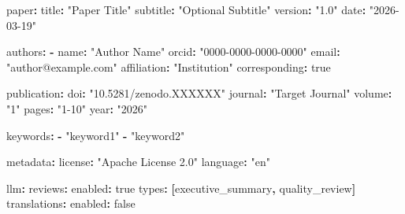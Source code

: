 \documentclass[
  english,
]{article}
\newenvironment{Shaded}{}{}
\newcommand{\AttributeTok}[1]{\textcolor[rgb]{0.49,0.56,0.16}{#1}}
\newcommand{\CharTok}[1]{\textcolor[rgb]{0.25,0.44,0.63}{#1}}
\newcommand{\FunctionTok}[1]{\textcolor[rgb]{0.02,0.16,0.49}{#1}}
\newcommand{\KeywordTok}[1]{\textcolor[rgb]{0.00,0.44,0.13}{\textbf{#1}}}
\newcommand{\StringTok}[1]{\textcolor[rgb]{0.25,0.44,0.63}{#1}}
\begin{document}
\begin{table}[h]
\caption{Configuration schema for \texttt{config.yaml}, showing all supported fields and their structure.}
\label{tab:config-reference}
\end{table}

\begin{Shaded}
\begin{Highlighting}[]
\FunctionTok{paper}\KeywordTok{:}
\AttributeTok{  }\FunctionTok{title}\KeywordTok{:}\AttributeTok{ }\StringTok{"Paper Title"}
\AttributeTok{  }\FunctionTok{subtitle}\KeywordTok{:}\AttributeTok{ }\StringTok{"Optional Subtitle"}
\AttributeTok{  }\FunctionTok{version}\KeywordTok{:}\AttributeTok{ }\StringTok{"1.0"}
\AttributeTok{  }\FunctionTok{date}\KeywordTok{:}\AttributeTok{ }\StringTok{"2026{-}03{-}19"}

\FunctionTok{authors}\KeywordTok{:}
\AttributeTok{  }\KeywordTok{{-}}\AttributeTok{ }\FunctionTok{name}\KeywordTok{:}\AttributeTok{ }\StringTok{"Author Name"}
\AttributeTok{    }\FunctionTok{orcid}\KeywordTok{:}\AttributeTok{ }\StringTok{"0000{-}0000{-}0000{-}0000"}
\AttributeTok{    }\FunctionTok{email}\KeywordTok{:}\AttributeTok{ }\StringTok{"author@example.com"}
\AttributeTok{    }\FunctionTok{affiliation}\KeywordTok{:}\AttributeTok{ }\StringTok{"Institution"}
\AttributeTok{    }\FunctionTok{corresponding}\KeywordTok{:}\AttributeTok{ }\CharTok{true}

\FunctionTok{publication}\KeywordTok{:}
\AttributeTok{  }\FunctionTok{doi}\KeywordTok{:}\AttributeTok{ }\StringTok{"10.5281/zenodo.XXXXXX"}
\AttributeTok{  }\FunctionTok{journal}\KeywordTok{:}\AttributeTok{ }\StringTok{"Target Journal"}
\AttributeTok{  }\FunctionTok{volume}\KeywordTok{:}\AttributeTok{ }\StringTok{"1"}
\AttributeTok{  }\FunctionTok{pages}\KeywordTok{:}\AttributeTok{ }\StringTok{"1{-}10"}
\AttributeTok{  }\FunctionTok{year}\KeywordTok{:}\AttributeTok{ }\StringTok{"2026"}

\FunctionTok{keywords}\KeywordTok{:}
\AttributeTok{  }\KeywordTok{{-}}\AttributeTok{ }\StringTok{"keyword1"}
\AttributeTok{  }\KeywordTok{{-}}\AttributeTok{ }\StringTok{"keyword2"}

\FunctionTok{metadata}\KeywordTok{:}
\AttributeTok{  }\FunctionTok{license}\KeywordTok{:}\AttributeTok{ }\StringTok{"Apache License 2.0"}
\AttributeTok{  }\FunctionTok{language}\KeywordTok{:}\AttributeTok{ }\StringTok{"en"}

\FunctionTok{llm}\KeywordTok{:}
\AttributeTok{  }\FunctionTok{reviews}\KeywordTok{:}
\AttributeTok{    }\FunctionTok{enabled}\KeywordTok{:}\AttributeTok{ }\CharTok{true}
\AttributeTok{    }\FunctionTok{types}\KeywordTok{:}\AttributeTok{ }\KeywordTok{[}\AttributeTok{executive\_summary}\KeywordTok{,}\AttributeTok{ quality\_review}\KeywordTok{]}
\AttributeTok{  }\FunctionTok{translations}\KeywordTok{:}
\AttributeTok{    }\FunctionTok{enabled}\KeywordTok{:}\AttributeTok{ }\CharTok{false}


\end{Highlighting}
\end{Shaded}
\end{document}
